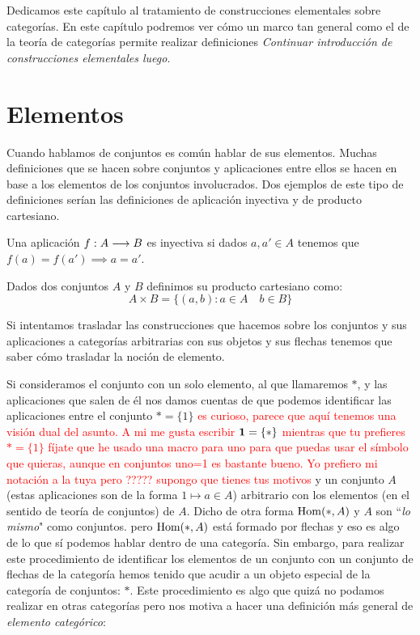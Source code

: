 Dedicamos este capítulo al tratamiento de construcciones elementales
sobre categorías. En este capítulo podremos ver cómo un marco tan general
como el de la teoría de categorías permite realizar definiciones
\textit{Continuar introducción de construcciones elementales luego}.

\section{Elementos}
Cuando hablamos de conjuntos es común hablar de sus elementos. Muchas
definiciones que se hacen sobre conjuntos y aplicaciones entre
ellos se hacen en base a los elementos de los conjuntos involucrados.
Dos ejemplos de este tipo de definiciones serían las definiciones de
aplicación inyectiva y de producto cartesiano.

\begin{definition*}
Una aplicación $f : A\longrightarrow B$ es inyectiva si dados
$a, a' \in A$ tenemos que $f(a) = f(a') \implies a = a'$.
\end{definition*}

\begin{definition*}
Dados dos conjuntos $A$ y $B$ definimos su producto cartesiano
como:
$$A\times B = \{ (a, b) : a \in A \quad b \in B \}$$
\end{definition*}

Si intentamos trasladar las construcciones que hacemos sobre los
conjuntos y sus aplicaciones a categorías arbitrarias con sus objetos
y sus flechas tenemos que saber cómo trasladar la noción de elemento.

Si consideramos el conjunto con un solo elemento, al que llamaremos
$*$, y las aplicaciones que salen de él nos damos cuentas de que podemos
identificar las aplicaciones entre el conjunto $* = \{ 1 \}$ \textcolor{red}{es curioso, parece que aquí tenemos una visión dual del asunto. A mi me gusta escribir $\mathbf{1}=\{*\}$ mientras que tu prefieres $*=\{1\}$ fíjate que he usado una macro para uno para que puedas usar el símbolo que quieras, aunque en conjuntos uno=1 es bastante bueno. Yo prefiero mi notación a la tuya pero ????? supongo que tienes tus motivos} y un conjunto
$A$ (estas aplicaciones son de la forma $1 \mapsto a \in A$)
arbitrario con los elementos (en el sentido de teoría de conjuntos)
de $A$. Dicho de otra forma $\operatorname{Hom}(*, A)$ y $A$ son ``\emph{lo mismo}"  como conjuntos.
pero $\operatorname{Hom}(*, A)$ está formado por flechas y eso es algo de lo que
sí podemos hablar dentro de una categoría. Sin embargo, para realizar
este procedimiento de identificar los elementos de un conjunto con
un conjunto de flechas de la categoría hemos tenido que acudir a un
objeto especial de la categoría de conjuntos: $*$. Este procedimiento
es algo que quizá no podamos realizar en otras categorías pero nos
motiva a hacer una definición más general de
\textit{elemento categórico}:

